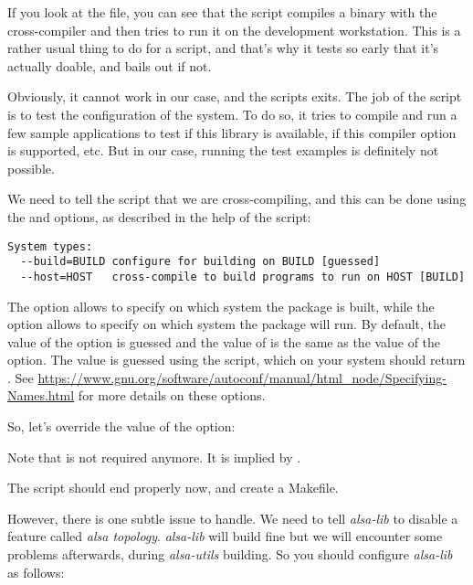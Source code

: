 If you look at the  file, you can see that the
 script compiles a binary with the cross-compiler
and then tries to run it on the development workstation. This is a
rather usual thing to do for a  script, and that's
why it tests so early that it's actually doable, and bails out if not.

Obviously, it cannot work in our case, and the scripts exits. The job
of the  script is to test the configuration of the system. To
do so, it tries to compile and run a few sample applications to test
if this library is available, if this compiler option is supported,
etc. But in our case, running the test examples is definitely not
possible.

We need to tell the  script that we are cross-compiling, and
this can be done using the  and  options,
as described in the help of the  script:

\begin{verbatim}
System types:
  --build=BUILD	configure for building on BUILD [guessed]
  --host=HOST	cross-compile to build programs to run on HOST [BUILD]
\end{verbatim}

The  option allows to specify on which system the
package is built, while the  option allows to specify on
which system the package will run. By default, the value of the
 option is guessed and the value of  is the
same as the value of the  option. The value is guessed
using the  script, which on your system should
return . See
\url{https://www.gnu.org/software/autoconf/manual/html_node/Specifying-Names.html}
for more details on these options.

So, let's override the value of the  option:


Note that  is not required anymore. It is implied
by .

The  script should end properly now, and create a
Makefile.

However, there is one subtle issue to handle.
We need to tell {\em alsa-lib} to disable a feature called {\em alsa topology}.
{\em alsa-lib} will build fine but we will encounter some
problems afterwards, during {\em alsa-utils} building.
So you should configure {\em alsa-lib} as follows:

